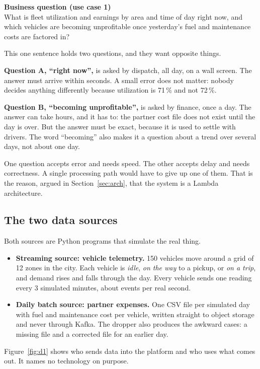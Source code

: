 \documentclass[11pt,a4paper]{article}
\newcommand{\callout}[2]{%
  \begin{calloutbox}\textbf{\textcolor{accent}{#1}}\\[2pt]#2\end{calloutbox}}
\begin{document}
\callout{Business question (use case 1)}{What is fleet utilization and earnings by
area and time of day right now, and which vehicles are becoming unprofitable once
yesterday's fuel and maintenance costs are factored in?}

This one sentence holds two questions, and they want opposite things.

\textbf{Question A, ``right now'',} is asked by dispatch, all day, on a wall screen.
The answer must arrive within seconds. A small error does not matter: nobody decides
anything differently because utilization is 71\,\% and not 72\,\%.

\textbf{Question B, ``becoming unprofitable'',} is asked by finance, once a day. The
answer can take hours, and it has to: the partner cost file does not exist until the
day is over. But the answer must be exact, because it is used to settle with drivers.
The word ``becoming'' also makes it a question about a trend over several days, not
about one day.

One question accepts error and needs speed. The other accepts delay and needs
correctness. A single processing path would have to give up one of them. That is the
reason, argued in Section~\ref{sec:arch}, that the system is a Lambda architecture.

\subsection{The two data sources}

Both sources are Python programs that simulate the real thing.

\begin{itemize}
  \item \textbf{Streaming source: vehicle telemetry.} 150 vehicles move around a grid
  of 12 zones in the city. Each vehicle is \emph{idle}, \emph{on the way} to a pickup,
  or \emph{on a trip}, and demand rises and falls through the day. Every vehicle sends
  one reading every 3 simulated minutes, about \mThroughput{} events per real second.
  \item \textbf{Daily batch source: partner expenses.} One CSV file per simulated day
  with fuel and maintenance cost per vehicle, written straight to object storage and
  never through Kafka. The dropper also produces the awkward cases: a missing file and
  a corrected file for an earlier day.
\end{itemize}

Figure~\ref{fig:d1} shows who sends data into the platform and who uses what comes
out. It names no technology on purpose.
\end{document}

